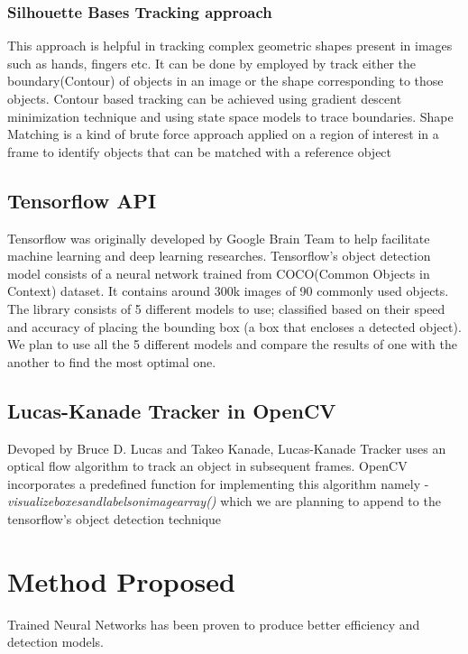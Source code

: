 \documentclass[10pt,twocolumn,letterpaper]{article}
\begin{document}
\subsubsection{Silhouette Bases Tracking approach}
This approach is helpful in tracking complex geometric shapes present in images such as hands, fingers etc. It can be done by employed by track either the boundary(Contour) of objects in an image or the shape corresponding to those objects. Contour based tracking can be achieved using gradient descent minimization technique and using state space models to trace boundaries. Shape Matching is a kind of brute force approach applied on a region of interest in a frame to identify objects that can be matched with a reference object


\subsection{Tensorflow API}

Tensorflow was originally developed by Google Brain Team to help facilitate machine learning and deep learning researches. Tensorflow's object detection model consists of a neural network trained from COCO(Common Objects in Context) dataset. It contains around 300k images of 90 commonly used objects. The library consists of 5 different models to use; classified based on their speed and accuracy of placing the bounding box (a box that encloses a detected object). We plan to use all the 5 different models and compare the results of one with the another to find the most optimal one.

\subsection{Lucas-Kanade Tracker in OpenCV}

Devoped by Bruce D. Lucas and Takeo Kanade, Lucas-Kanade Tracker uses an optical flow algorithm to track an object in subsequent frames. OpenCV incorporates a predefined function for implementing this algorithm namely -\textit{visualize\textunderscore boxes\textunderscore and\textunderscore labels\textunderscore on\textunderscore image\textunderscore array()} which we are planning to append to the tensorflow's object detection technique


\section{Method Proposed}
Trained Neural Networks has been proven to produce better efficiency and detection models. 
\end{document}
